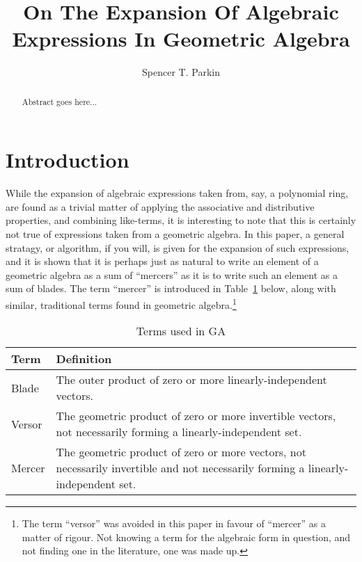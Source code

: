 \documentclass{birkjour}
\theoremstyle{definition}
\theoremstyle{remark}
\numberwithin{equation}{section}
\begin{document}
\title{On The Expansion Of Algebraic Expressions In Geometric Algebra}

\author{Spencer T. Parkin}



\begin{abstract}
Abstract goes here...
\end{abstract}


\maketitle

\section{Introduction}

While the expansion of algebraic expressions taken from, say, a polynomial ring, are found as a trivial matter
of applying the associative and distributive properties, and combining like-terms, it is interesting to note
that this is certainly not true of expressions taken from a geometric algebra.  In this paper, a general
stratagy, or algorithm, if you will, is given for the expansion of such expressions, and it is shown that
it is perhaps just as natural to write an element of a geometric algebra as a sum of ``mercers'' as it is to
write such an element as a sum of blades.  The term ``mercer'' is introduced in Table~\ref{tbl_terms} below,
along with similar, traditional terms found in geometric algebra.\footnote{The term ``versor'' was avoided in
this paper in favour of ``mercer'' as a matter of rigour.  Not knowing a term for the algebraic form in question, and not finding
one in the literature, one was made up.}

\begin{table}[H]\label{tbl_terms}\caption{Terms used in GA}
\begin{tabular}{p{1cm}p{9cm}}
Term & Definition \\
\hline
Blade & The outer product of zero or more linearly-independent vectors. \\
Versor & The geometric product of zero or more invertible vectors, not necessarily forming a linearly-independent set. \\
Mercer & The geometric product of zero or more vectors, not necessarily invertible and not necessarily forming a linearly-independent set.
\end{tabular}
\end{table}
\end{document}
